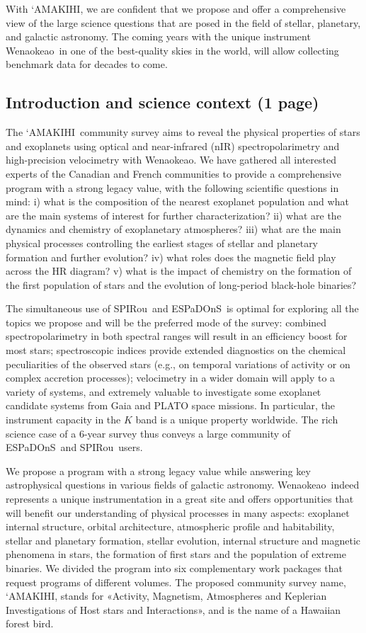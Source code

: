 \documentclass[
    traditabstract,
    longauth,
    onecolumn,
]{aa}
\def \amakihi{`AMAKIHI}
\def \spi{SPIRou}
\def \esp{ESPaDOnS}
\def \wena{Wenaokeao}
\begin{document}
With \amakihi, we are confident that we propose and offer a comprehensive view of the large science questions that are posed in the field of stellar, planetary, and galactic astronomy. The coming years with the unique instrument \wena\, in one of the best-quality skies in the world, will allow collecting benchmark data for decades to come. 

\newpage

\subsection{Introduction and science context (1 page)}
The \amakihi\ community survey aims to reveal the physical properties of stars and exoplanets using optical and near-infrared (nIR) spectropolarimetry and high-precision velocimetry with \wena. We have gathered all interested experts of the Canadian and French communities to provide a comprehensive program with a strong legacy value, with the following scientific questions in mind: i) what is the composition of the nearest exoplanet population and what are the main systems of interest for further characterization? ii) what are the dynamics and chemistry of exoplanetary atmospheres? iii) what are the main physical processes controlling the earliest stages of stellar and planetary formation and further evolution? iv) what roles does the magnetic field play across the HR diagram? v) what is the impact of chemistry on the formation of the first population of stars and the evolution of long-period black-hole binaries?

The simultaneous use of \spi\ and \esp\ is optimal for exploring all the topics we propose and will be the preferred mode of the survey: combined spectropolarimetry in both spectral ranges will result in an efficiency boost for most stars; spectroscopic indices provide extended diagnostics on the chemical peculiarities of the observed stars (e.g., on temporal variations of activity or on complex accretion processes); velocimetry in a wider domain will apply to a variety of systems, and extremely valuable to investigate some exoplanet candidate systems from Gaia and PLATO space missions. In particular, the instrument capacity in the $K$ band is a unique property worldwide. The rich science case of a 6-year  survey thus conveys a large community of \esp\ and \spi\ users.

We propose a program with a strong legacy value while answering key astrophysical questions in various fields of galactic astronomy. \wena\ indeed represents a unique instrumentation in a great site and offers opportunities that will benefit our understanding of physical processes in many aspects: exoplanet internal structure, orbital architecture, atmospheric profile and habitability, stellar and planetary formation, stellar evolution, internal structure and magnetic phenomena in stars, the formation of first stars and the population of extreme binaries. 
We divided the program into six complementary work packages that request programs of different volumes.
The proposed community survey name, \amakihi, stands for «Activity, Magnetism, Atmospheres and Keplerian Investigations of Host stars and Interactions», and is the name of a Hawaiian forest bird.
\end{document}
